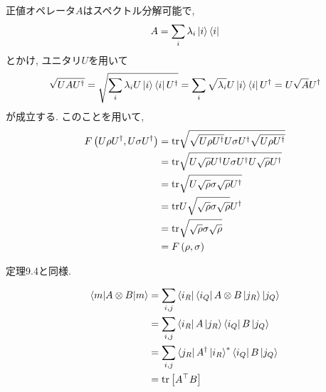 \begin{ex}
    \label{ex9.14}
    正値オペレータ$A$はスペクトル分解可能で,
    \begin{align*}
        A = \sum_i \lambda_i \ket{i}\bra{i}
    \end{align*}
    とかけ, ユニタリ$U$を用いて
    \begin{align*}
        \sqrt{UAU^\dagger}
        =
        \sqrt{\sum_i \lambda_i U\ket{i}\bra{i}U^\dagger}
        =
        \sum_i\sqrt{\lambda_i} U\ket{i}\bra{i}U^\dagger
        =
        U \sqrt{A} U^\dagger
    \end{align*}
    が成立する. このことを用いて,
    \begin{align*}
        F \left( U \rho U^\dagger, U \sigma U^\dagger\right)
         & =
        \mathrm{tr} \sqrt{ \sqrt{U \rho U^\dagger} U \sigma U^\dagger \sqrt{U \rho U^\dagger}}
        \\
         & =
        \mathrm{tr} \sqrt{ U \sqrt{\rho} U^\dagger U \sigma U^\dagger U \sqrt{\rho} U^\dagger}
        \\
         & =
        \mathrm{tr} \sqrt{ U \sqrt{\rho} \sigma \sqrt{\rho} U^\dagger}
        \\
         & =
        \mathrm{tr} U  \sqrt{\sqrt{\rho} \sigma \sqrt{\rho}} U^\dagger
        \\
         & =
        \mathrm{tr} \sqrt{\sqrt{\rho} \sigma \sqrt{\rho}}
        \\
         & =
        F \left(\rho, \sigma\right)
    \end{align*}
\end{ex}

\begin{ex}
    \label{ex9.15}
    定理9.4と同様.
\end{ex}

\begin{ex}
    \label{ex9.16}
    \begin{align*}
        \braket{m|A \otimes B|m}
         & =
        \sum_{i,j}
        \bra{i_R} \bra{i_Q}
        A \otimes B
        \ket{j_R} \ket{j_Q}
        \\
         & =
        \sum_{i,j}
        \bra{i_R}A\ket{j_R}
        \bra{i_Q}B\ket{j_Q}
        \\
         & =
        \sum_{i,j}
        \bra{j_R}A^\dagger\ket{i_R}^{*}
        \bra{i_Q}B\ket{j_Q}
        \\
         & =
        \mathrm{tr} \left[ A^\top B\right]
    \end{align*}
\end{ex}


